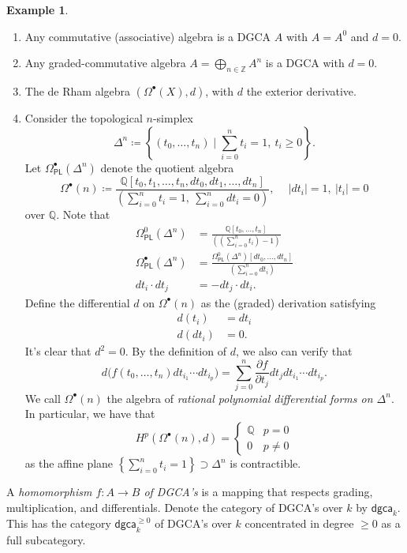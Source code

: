 \documentclass[10pt,letterpaper,cm]{nupset}
\theoremstyle{definition}
\newtheorem{exmp}[defn]{Example}
\theoremstyle{theorem}
\theoremstyle{remark}
\newcommand{\PL}{\mathsf{PL}}
\newcommand{\Q}{\mathbb Q}
\newcommand{\Z}{\mathbb Z}
\newcommand{\1}{\mathbb{1}}
\newcommand{\dgca}{\mathsf{dgca}}
\newcommand{\0}{\vec 0}
\newcommand{\be}{\begin{enumerate}}
\newcommand{\ee}{\end{enumerate}}
\begin{document}
\begin{exmp}\label{fstex} $ $
\be[label=(\arabic*)]
\item Any commutative (associative) algebra is a DGCA $A$ with $A =A^0$ and $d=0$.
\item Any graded-commutative algebra $A = \bigoplus_{n\in \Z}A^n$ is a DGCA with $d=0$.
\item The de Rham algebra $\left(\Omega^{\bullet}(X),d\right)$, with $d$ the exterior derivative.
\item Consider the topological $n$-simplex 
\[
\Delta^n \coloneqq \left\{\left(t_0, \ldots, t_n\right) \mid \sum_{i=0}^n t_i= 1, \ t_i \geq 0\right\}.
\] Let $\Omega^{\bullet}_{\PL}(\Delta^n)$ denote the quotient algebra
\[
\Omega^{\bullet}(n) \coloneqq \frac{\Q\left[t_0, t_1, \ldots, t_n, d{t_0}, d{t_1},\ldots, d{t_n}\right]}{\left(\sum_{i=0}^n{t_i} = 1, \ \sum_{i=0}^n d{t_i} =0\right)}, \quad  \ \left\lvert{d{t_i}}\right\rvert = 1, \ \left\lvert{t_i}\right\rvert = 0
\] over $\Q$. Note that 
\begin{align*}
\Omega^0_{\PL}(\Delta^n) & = \frac{\Q\left[t_0, \ldots, t_n\right]}{\left(\left(\sum_{i=0}^n t_i\right) -1 \right)}
\\ \Omega^{\bullet}_{\PL}(\Delta^n) & = \frac{\Omega^0_{\PL}(\Delta^n)\left[d{t_0}, \ldots, d{t_n}\right]}{\left(\sum_{i=0}^n d{t_i}\right)}  
\\ d{t_i}\cdot d{t_j} & = {- d{t_j} \cdot d{t_i}}
.\end{align*}
Define the differential $d$ on $\Omega^{\bullet}(n)$ as the (graded) derivation satisfying
\begin{align*}
d(t_i) &  = d{t_i}
\\  d\left(d{t_i}\right) & = 0.
\end{align*}
It's clear that $d^2 =0$.
By the definition of $d$, we also can verify that
\[
d\big(f(t_0, \ldots, t_n)d{t_{i_1}}\cdots d{t_{i_p}}\big) = \sum_{j=0}^n \frac{\partial{f}}{\partial{t_j}}d{t_j}d{t_{i_1}}\cdots d{t_{i_p}}
.\]
We call $\Omega^{\bullet}(n)$ the algebra of \textit{rational polynomial differential forms on $\Delta^n$}. In particular, we have that
\[
H^p(\Omega^{\bullet}(n), d) = \begin{cases}
\Q & p = 0 
\\ 0 & p \ne 0
\end{cases}
\]
as the affine plane $\left\{\sum_{i=0}^n t_i =1\right\} \supset \Delta^n$ is contractible. 
\ee
\end{exmp}

A \textit{homomorphism $f: A \to B$ of DGCA's} is a mapping that respects grading, multiplication, and differentials. Denote the category of DGCA's over $k$ by $\dgca_k$. This has the category $\dgca_k^{\geq 0}$ of DGCA's over $k$ concentrated in degree $\geq 0$ as a full subcategory. 
\end{document}
